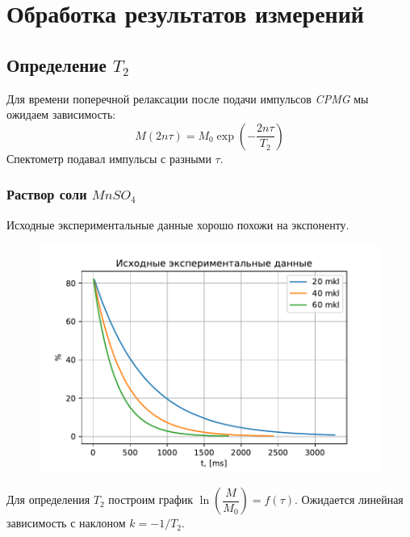 \section{Обработка результатов измерений}
\subsection{Определение $T_2$}
Для времени поперечной релаксации после подачи импульсов \textit{CPMG} мы ожидаем зависимость:
\begin{equation}
\label{eq:M2-from-T2}
M (2n \tau) = M_0 \exp \left( -\dfrac{2n\tau}{T_2} \right)
\end{equation}
Спектометр подавал импульсы с разными $ \tau $.
\subsubsection{Раствор соли $MnSO_4$}
Исходные экспериментальные данные хорошо похожи на экспоненту.
\begin{figure}[h]
	\hspace{-5em}
	\includegraphics[width=1.2\linewidth]{data/Mn_T_2_exper}
	\caption{}
	\label{fig:mnt2exper}
\end{figure}

Для определения $ T_2 $ построим график $ \ln \left(\dfrac{M}{M_0} \right) = f(\tau) $. Ожидается линейная зависимость с наклоном $ k = -1/T_2 $.

